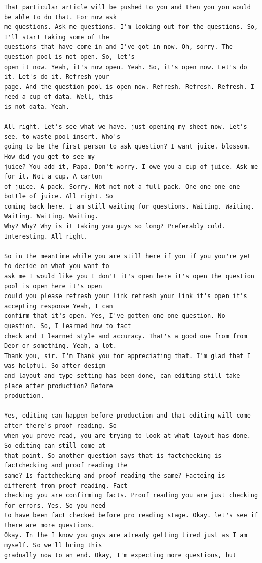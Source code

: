 {\begin{Verbatim}
That particular article will be pushed to you and then you you would be able to do that. For now ask
me questions. Ask me questions. I'm looking out for the questions. So, I'll start taking some of the
questions that have come in and I've got in now. Oh, sorry. The question pool is not open. So, let's
open it now. Yeah, it's now open. Yeah. So, it's open now. Let's do it. Let's do it. Refresh your
page. And the question pool is open now. Refresh. Refresh. Refresh. I need a cup of data. Well, this
is not data. Yeah.

All right. Let's see what we have. just opening my sheet now. Let's see. to waste pool insert. Who's
going to be the first person to ask question? I want juice. blossom. How did you get to see my
juice? You add it, Papa. Don't worry. I owe you a cup of juice. Ask me for it. Not a cup. A carton
of juice. A pack. Sorry. Not not not a full pack. One one one one bottle of juice. All right. So
coming back here. I am still waiting for questions. Waiting. Waiting. Waiting. Waiting. Waiting.
Why? Why? Why is it taking you guys so long? Preferably cold. Interesting. All right.

So in the meantime while you are still here if you if you you're yet to decide on what you want to
ask me I would like you I don't it's open here it's open the question pool is open here it's open
could you please refresh your link refresh your link it's open it's accepting response Yeah, I can
confirm that it's open. Yes, I've gotten one one question. No question. So, I learned how to fact
check and I learned style and accuracy. That's a good one from from Deor or something. Yeah, a lot.
Thank you, sir. I'm Thank you for appreciating that. I'm glad that I was helpful. So after design
and layout and type setting has been done, can editing still take place after production? Before
production.

Yes, editing can happen before production and that editing will come after there's proof reading. So
when you prove read, you are trying to look at what layout has done. So editing can still come at
that point. So another question says that is factchecking is factchecking and proof reading the
same? Is factchecking and proof reading the same? Facteing is different from proof reading. Fact
checking you are confirming facts. Proof reading you are just checking for errors. Yes. So you need
to have been fact checked before pro reading stage. Okay. let's see if there are more questions.
Okay. In the I know you guys are already getting tired just as I am myself. So we'll bring this
gradually now to an end. Okay, I'm expecting more questions, but


\end{Verbatim}}
